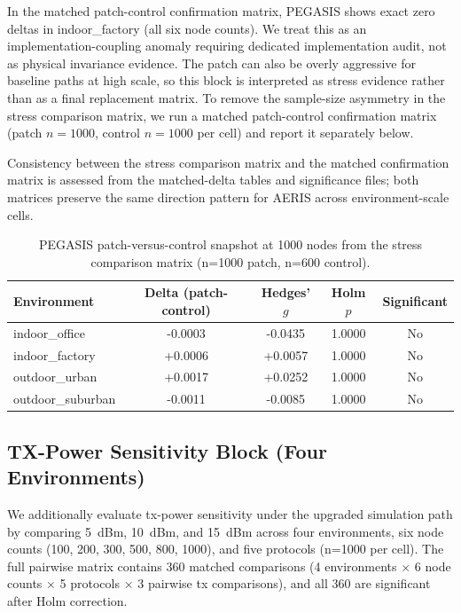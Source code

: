 ﻿\documentclass[sensors,article,submit,moreauthors,pdftex]{Definitions/mdpi}
\begin{document}
In the matched patch-control confirmation matrix, PEGASIS shows exact zero deltas in indoor\_factory (all six node counts). We treat this as an implementation-coupling anomaly requiring dedicated implementation audit, not as physical invariance evidence. The patch can also be overly aggressive for baseline paths at high scale, so this block is interpreted as stress evidence rather than as a final replacement matrix. To remove the sample-size asymmetry in the stress comparison matrix, we run a matched patch-control confirmation matrix (patch \(n=1000\), control \(n=1000\) per cell) and report it separately below.

Consistency between the stress comparison matrix and the matched confirmation matrix is assessed from the matched-delta tables and significance files; both matrices preserve the same direction pattern for AERIS across environment-scale cells.

\begin{table}[H]
\caption{PEGASIS patch-versus-control snapshot at 1000 nodes from the stress comparison matrix (n=1000 patch, n=600 control).}
\label{tab:s9_pegasis_1000}
\centering
\begin{tabular}{lcccc}
\toprule
Environment & Delta (patch-control) & Hedges' $g$ & Holm $p$ & Significant \\
\midrule
indoor\_office    & -0.0003 & -0.0435 & 1.0000 & No \\
indoor\_factory   & +0.0006 & +0.0057 & 1.0000 & No \\
outdoor\_urban    & +0.0017 & +0.0252 & 1.0000 & No \\
outdoor\_suburban & -0.0011 & -0.0085 & 1.0000 & No \\
\bottomrule
\end{tabular}
\end{table}

\subsection{TX-Power Sensitivity Block (Four Environments)}
We additionally evaluate tx-power sensitivity under the upgraded simulation path by comparing \SI{5}{dBm}, \SI{10}{dBm}, and \SI{15}{dBm} across four environments, six node counts (100, 200, 300, 500, 800, 1000), and five protocols (n=1000 per cell). The full pairwise matrix contains 360 matched comparisons (4 environments $\times$ 6 node counts $\times$ 5 protocols $\times$ 3 pairwise tx comparisons), and all 360 are significant after Holm correction.
\end{document}
